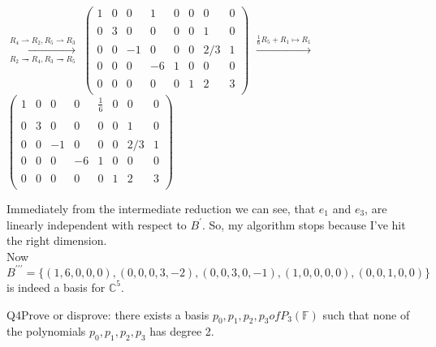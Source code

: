 \documentclass{article}
\begin{document}
$\xrightarrow[R_2 \rightharpoondown R_4,R_3 \rightharpoondown R_5]{R_4 \rightharpoonup R_2,R_5 \rightharpoonup R_3}$
$\begin{pmatrix}1 & 0 & 0 & 1 & 0 & 0 & 0 & 0\\\\0 & 3 & 0 & 0 & 0 & 0
  & 1 & 0\\\\0 & 0 & -1 & 0 & 0 & 0 & 2/3 & 1\\0 & 0 & 0 & -6 & 1 & 0
  & 0 & 0\\\\0 & 0 & 0 & 0 & 0 & 1 & 2 & 3\\\end{pmatrix}$
$\xrightarrow[]{\frac{1}{6}R_5+R_1 \mapsto R_1}$
$\begin{pmatrix}1 & 0 & 0 & 0 & \frac{1}{6} & 0 & 0 & 0\\\\0 & 3 & 0 &
  0 & 0 & 0 & 1 & 0\\\\0 & 0 & -1 & 0 & 0 & 0 & 2/3 & 1\\0 & 0 & 0 &
  -6 & 1 & 0 & 0 & 0\\\\0 & 0 & 0 & 0 & 0 & 1 & 2 & 3\\\end{pmatrix}$

Immediately from the intermediate reduction we can see, that $e_1$ and
$e_3$, are linearly independent with respect to $B^\prime$. So, my
algorithm stops because I've hit the right dimension.\\ Now
$B^{\prime\prime\prime} =
\{(1,6,0,0,0),(0,0,0,3,-2),(0,0,3,0,-1),(1,0,0,0,0),(0,0,1,0,0)\}$ is
indeed a basis for $\mathbb{C}^5$.
\newpage

Q4\quad Prove or disprove: there exists a basis $p_0 , p_1 , p_2 , p_3 of P_3(\mathbb{F})$ such
that none of the polynomials $p_0 , p_1 , p_2 , p_3$ has degree 2.\\

\vspace{0.618cm}
\end{document}
